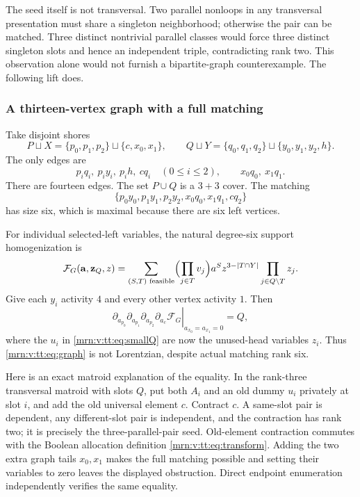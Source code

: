 \documentclass[11pt,a4paper]{article}
\theoremstyle{remark}\newtheorem{remark}[theorem]{Remark}
\begin{document}
The seed itself is not transversal. Two parallel nonloops in any transversal presentation must share a singleton neighborhood; otherwise the pair can be matched. Three distinct nontrivial parallel classes would force three distinct singleton slots and hence an independent triple, contradicting rank two. This observation alone would not furnish a bipartite-graph counterexample. The following lift does.

\subsubsection{A thirteen-vertex graph with a full matching}\label{mrn:v:tt:sec:graph13}
Take disjoint shores
\[
 P\sqcup X=\{p_0,p_1,p_2\}\sqcup\{c,x_0,x_1\},\qquad
 Q\sqcup Y=\{q_0,q_1,q_2\}\sqcup\{y_0,y_1,y_2,h\}.
\]
The only edges are
\begin{equation}\label{mrn:v:tt:eq:edges}
 p_iq_i,\ p_iy_i,\ p_ih,\ cq_i\quad(0\le i\le2),
 \qquad x_0q_0,\ x_1q_1.
\end{equation}
There are fourteen edges. The set $P\cup Q$ is a $3+3$ cover. The matching
\[
 \{p_0y_0,p_1y_1,p_2y_2,x_0q_0,x_1q_1,cq_2\}
\]
has size six, which is maximal because there are six left vertices.

For individual selected-left variables, the natural degree-six support homogenization is
\begin{equation}\label{mrn:v:tt:eq:graph}
 \mathcal F_G(\mathbf a,\mathbf z_Q,z)
 =\sum_{(S,T)\text{ feasible}}\Bigl(\prod_{j\in T}v_j\Bigr)a^S
         z^{3-|T\cap Y|}\prod_{j\in Q\setminus T}z_j.
\end{equation}
Give each $y_i$ activity $4$ and every other vertex activity $1$. Then
\[
 \left.\partial_{a_{p_0}}\partial_{a_{p_1}}\partial_{a_{p_2}}
      \partial_{a_c}\mathcal F_G\right|_{a_{x_0}=a_{x_1}=0}=Q,
\]
where the $u_i$ in \eqref{mrn:v:tt:eq:smallQ} are now the unused-head variables $z_i$. Thus \eqref{mrn:v:tt:eq:graph} is not Lorentzian, despite actual matching rank six.

Here is an exact matroid explanation of the equality. In the rank-three transversal matroid with slots $Q$, put both $A_i$ and an old dummy $u_i$ privately at slot $i$, and add the old universal element $c$. Contract $c$. A same-slot pair is dependent, any different-slot pair is independent, and the contraction has rank two; it is precisely the three-parallel-pair seed. Old-element contraction commutes with the Boolean allocation definition \eqref{mrn:v:tt:eq:transform}. Adding the two extra graph tails $x_0,x_1$ makes the full matching possible and setting their variables to zero leaves the displayed obstruction. Direct endpoint enumeration independently verifies the same equality.
\end{document}
